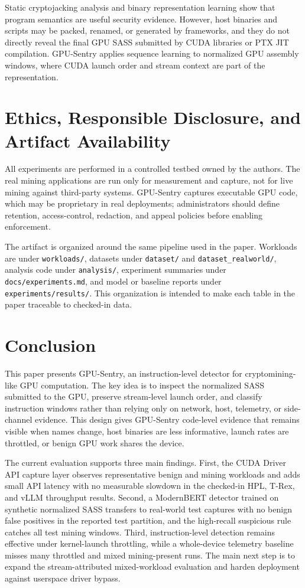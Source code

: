 Static cryptojacking analysis and binary representation learning show that program semantics are useful security evidence. However, host binaries and scripts may be packed, renamed, or generated by frameworks, and they do not directly reveal the final GPU SASS submitted by CUDA libraries or PTX JIT compilation. GPU-Sentry applies sequence learning to normalized GPU assembly windows, where CUDA launch order and stream context are part of the representation.

\section{Ethics, Responsible Disclosure, and Artifact Availability}

All experiments are performed in a controlled testbed owned by the authors. The real mining applications are run only for measurement and capture, not for live mining against third-party systems. GPU-Sentry captures executable GPU code, which may be proprietary in real deployments; administrators should define retention, access-control, redaction, and appeal policies before enabling enforcement.

The artifact is organized around the same pipeline used in the paper. Workloads are under \texttt{workloads/}, datasets under \texttt{dataset/} and \texttt{dataset\_realworld/}, analysis code under \texttt{analysis/}, experiment summaries under \texttt{docs/experiments.md}, and model or baseline reports under \texttt{experiments/results/}. This organization is intended to make each table in the paper traceable to checked-in data.

\section{Conclusion}

This paper presents GPU-Sentry, an instruction-level detector for cryptomining-like GPU computation. The key idea is to inspect the normalized SASS submitted to the GPU, preserve stream-level launch order, and classify instruction windows rather than relying only on network, host, telemetry, or side-channel evidence. This design gives GPU-Sentry code-level evidence that remains visible when names change, host binaries are less informative, launch rates are throttled, or benign GPU work shares the device.

The current evaluation supports three main findings. First, the CUDA Driver API capture layer observes representative benign and mining workloads and adds small API latency with no measurable slowdown in the checked-in HPL, T-Rex, and vLLM throughput results. Second, a ModernBERT detector trained on synthetic normalized SASS transfers to real-world test captures with no benign false positives in the reported test partition, and the high-recall suspicious rule catches all test mining windows. Third, instruction-level detection remains effective under kernel-launch throttling, while a whole-device telemetry baseline misses many throttled and mixed mining-present runs. The main next step is to expand the stream-attributed mixed-workload evaluation and harden deployment against userspace driver bypass.
